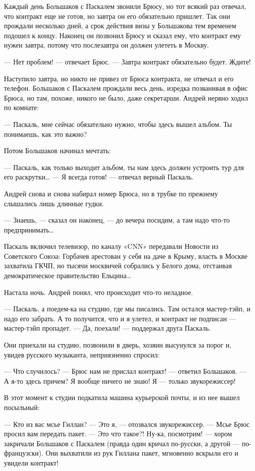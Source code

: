 \documentclass[16pt,a5paper]{book}
\begin{document}
Каждый день Большаков с Паскалем звонили Брюсу, но тот всякий раз отвечал, что контракт еще не готов, но завтра он его
обязательно пришлет. Так они прождали несколько дней, а срок действия визы у Большакова тем временем подошел к концу.
Наконец он позвонил Брюсу и сказал ему, что контракт ему нужен завтра, потому что послезавтра он должен улететь в
Москву.

— Нет проблем! — отвечает Брюс. — Завтра контракт обязательно будет. Ждите!

Наступило завтра, но никто не привез от Брюса контракта, не отвечал и его телефон. Большаков с Паскалем прождали весь
день, изредка позванивая в офис Брюса, но там, похоже, никого не было, даже секретарши. Андрей нервно ходил по комнате:

— Паскаль, мне сейчас обязательно нужно, чтобы здесь вышел альбом. Ты понимаешь, как это важно?

Потом Большаков начинал мечтать:

— Паскаль, как только выходит альбом, ты нам здесь должен устроить тур для его раскрутки\ldots
— Я всегда готов! — отвечал верный Паскаль.

Андрей снова и снова набирал номер Брюса, но в трубке по прежнему слышались лишь длинные гудки.

— Знаешь, — сказал он наконец, — до вечера посидим, а там надо что-то предпринимать\ldots

Паскаль включил телевизор, по каналу «CNN» передавали Новости из Советского Союза: Горбачев арестован у себя на даче в
Крыму, власть в Москве захватила ГКЧП, но тысячи москвичей собрались у Белого дома, отстаивая демократическое
правительство Ельцина\ldots

Настала ночь. Андрей понял, что происходит что-то неладное.

— Паскаль, а поедем-ка на студию, где мы писались. Там остался мастер-тэйп, и надо его забрать. А то получится, что и я
улетел, и контракт не подписан — мастер-тэйп пропадет.
— Да, поехали! — поддержал друга Паскаль.

Они приехали на студию, позвонили в дверь, хозяин высунулся за порог и, увидев русского музыканта, неприязненно спросил:

— Что случилось?
— Брюс нам не прислал контракт! — ответил Большаков.
— А я-то здесь причем? Я вообще ничего не знаю! Я — только звукорежиссер!

В этот момент к студии подкатила машина курьерской почты, и из нее вышел посыльный:

— Кто из вас мсье Гиллан?
— Это я, — отозвался звукорежиссер.
— Мсье Брюс просил вам передать пакет.
— Это что такое?! Ну-ка, посмотрим! — хором закричали Большаков с Паскалем (правда один кричал по-русски, а другой —
по-французски). Они выхватили из рук Гиллана пакет, мгновенно вскрыли его и увидели контракт!
\end{document}
